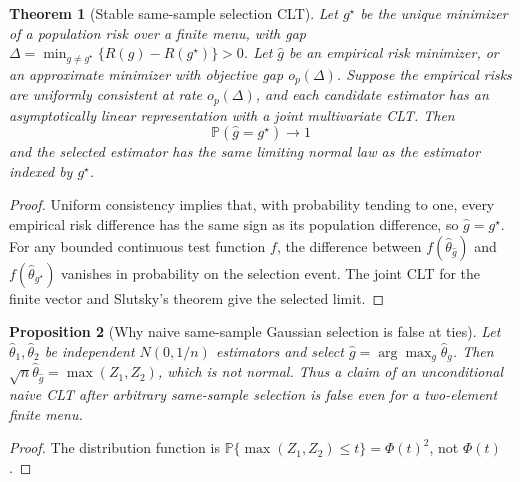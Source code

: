 \documentclass[11pt,a4paper]{article}
\numberwithin{equation}{section}
\newtheorem{theorem}{Theorem}[section]
\newtheorem{proposition}[theorem]{Proposition}
\theoremstyle{definition}\newtheorem{definition}[theorem]{Definition}
\theoremstyle{remark}\newtheorem{remark}[theorem]{Remark}
\begin{document}
\begin{theorem}[Stable same-sample selection CLT]\label{thm:stableselect}
Let $g^\star$ be the unique minimizer of a population risk over a finite menu, with gap
$\Delta=\min_{g\ne g^\star}\{R(g)-R(g^\star)\}>0$. Let $\hat g$ be an empirical risk minimizer, or an approximate minimizer with objective gap $o_p(\Delta)$. Suppose the empirical risks are uniformly consistent at rate $o_p(\Delta)$, and each candidate estimator has an asymptotically linear representation with a joint multivariate CLT. Then
\[
 \mathbb P(\hat g=g^\star)\to1
\]
and the selected estimator has the same limiting normal law as the estimator indexed by $g^\star$.
\end{theorem}
\begin{proof}
Uniform consistency implies that, with probability tending to one, every empirical risk difference has the same sign as its population difference, so $\hat g=g^\star$. For any bounded continuous test function $f$, the difference between $f(\widehat\theta_{\hat g})$ and $f(\widehat\theta_{g^\star})$ vanishes in probability on the selection event. The joint CLT for the finite vector and Slutsky's theorem give the selected limit.
\end{proof}

\begin{proposition}[Why naive same-sample Gaussian selection is false at ties]\label{prop:winner}
Let $\hat\theta_1,\hat\theta_2$ be independent $N(0,1/n)$ estimators and select $\hat g=\arg\max_g\hat\theta_g$. Then
$\sqrt n\hat\theta_{\hat g}=\max(Z_1,Z_2)$, which is not normal. Thus a claim of an unconditional naive CLT after arbitrary same-sample selection is false even for a two-element finite menu.
\end{proposition}
\begin{proof}
The distribution function is
$\mathbb P\{\max(Z_1,Z_2)\le t\}=\Phi(t)^2$, not $\Phi(t)$.
\end{proof}
\end{document}
